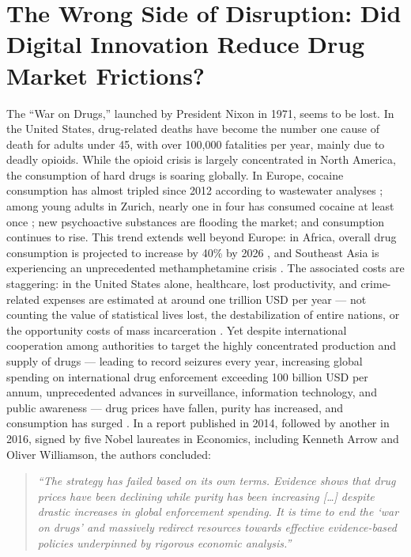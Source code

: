 \documentclass[12pt, a4paper]{article}
\begin{document}
\newpage
\section{The Wrong Side of Disruption: Did Digital Innovation Reduce Drug Market Frictions?}
\label{sec:paper2}

The ``War on Drugs,'' launched by President Nixon in 1971, seems to be lost. In the United States, drug-related deaths have become the number one cause of death for adults under 45, with over 100,000 fatalities per year, mainly due to deadly opioids. While the opioid crisis is largely concentrated in North America, the consumption of hard drugs is soaring globally. In Europe, cocaine consumption has almost tripled since 2012 according to wastewater analyses \citep{wastewater_2026}; among young adults in Zurich, nearly one in four has consumed cocaine at least once \citep{quednow_uzh_2025}; new psychoactive substances are flooding the market; and consumption continues to rise. This trend extends well beyond Europe: in Africa, overall drug consumption is projected to increase by 40\% by 2026 \citep{africa_2025}, and Southeast Asia is experiencing an unprecedented methamphetamine crisis \citep{asia_2025}. The associated costs are staggering: in the United States alone, healthcare, lost productivity, and crime-related expenses are estimated at around one trillion USD per year --- not counting the value of statistical lives lost, the destabilization of entire nations, or the opportunity costs of mass incarceration \citep{ncdas_2025, whitehouse_opioid_2025}. Yet despite international cooperation among authorities to target the highly concentrated production and supply of drugs --- leading to record seizures every year, increasing global spending on international drug enforcement exceeding 100 billion USD per annum, unprecedented advances in surveillance, information technology, and public awareness --- drug prices have fallen, purity has increased, and consumption has surged \citep{count_costs_2013}. In a report published in 2014, followed by another in 2016, signed by five Nobel laureates in Economics, including Kenneth Arrow and Oliver Williamson, the authors concluded:

\begin{quote}
\textit{``The strategy has failed based on its own terms. Evidence shows 
that drug prices have been declining while purity has been increasing 
[\ldots] despite drastic increases in global enforcement spending. It is 
time to end the `war on drugs' and massively redirect resources towards 
effective evidence-based policies underpinned by rigorous economic 
analysis.''} \citep{lse_2014}
\end{quote}
\end{document}
